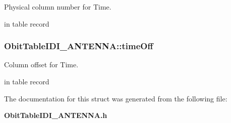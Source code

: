 Physical column number for Time. 

in table record 
\subsubsection{ {\bf Obit\-Table\-IDI\_\-ANTENNA::time\-Off}}\label{structObitTableIDI__ANTENNA_o28}


Column offset for Time. 

in table record 

The documentation for this struct was generated from the following file:\begin{CompactItemize}
\item 
{\bf Obit\-Table\-IDI\_\-ANTENNA.h}\end{CompactItemize}
